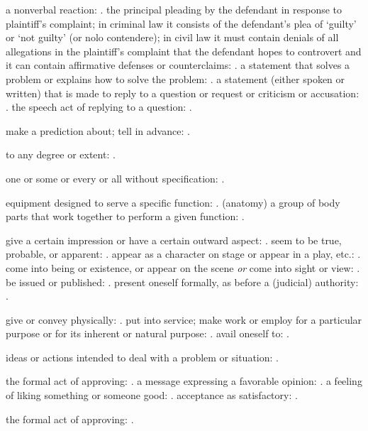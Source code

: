   a nonverbal reaction: . the principal pleading by the defendant in response to plaintiff's complaint; in criminal law it consists of the defendant's plea of `guilty' or `not guilty' (or nolo contendere); in civil law it must contain denials of all allegations in the plaintiff's complaint that the defendant hopes to controvert and it can contain affirmative defenses or counterclaims: . a statement that solves a problem or explains how to solve the problem: . a statement (either spoken or written) that is made to reply to a question or request or criticism or accusation: . the speech act of replying to a question: .

  make a prediction about; tell in advance: .

  to any degree or extent: .

  one or some or every or all without specification: .

  equipment designed to serve a specific function: . (anatomy) a group of body parts that work together to perform a given function: .

  give a certain impression or have a certain outward aspect: . seem to be true, probable, or apparent: . appear as a character on stage or appear in a play, etc.: . come into being or existence, or appear on the scene \textit{or} come into sight or view: . be issued or published: . present oneself formally, as before a (judicial) authority: .

  give or convey physically: . put into service; make work or employ for a particular purpose or for its inherent or natural purpose: . avail oneself to: .

  ideas or actions intended to deal with a problem or situation: .

  the formal act of approving: . a message expressing a favorable opinion: . a feeling of liking something or someone good: . acceptance as satisfactory: .

  the formal act of approving: .

